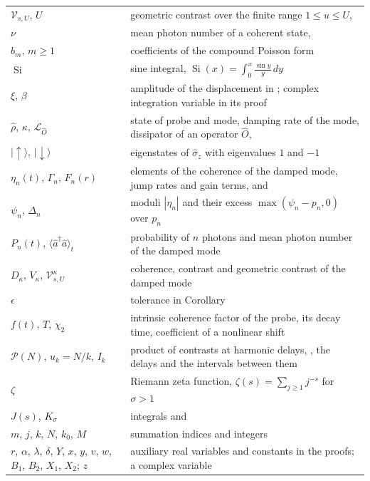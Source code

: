 \documentclass[11pt,reqno]{amsart}
\makeatletter
\providecommand{\ket}[1]{|#1\rangle}
\let\CG@origref\ref
\let\CG@origeqref\eqref
\newcommand{\CG@gettip}[1]{\@ifundefined{CGTip@#1}{Reference: #1}{\csname CGTip@#1\endcsname}}
\DeclareRobustCommand{\CGref}[1]{\pdftooltip{\CG@origref{#1}}{\CG@gettip{#1}}}
\DeclareRobustCommand{\CGeqref}[1]{\pdftooltip{\CG@origeqref{#1}}{\CG@gettip{#1}}}
\numberwithin{equation}{section}
\theoremstyle{plain}
\theoremstyle{definition}
\theoremstyle{remark}
\makeatother
\begin{document}
\begin{table}[!htb]
\begin{tabular}{p{}p{}}
$\mathcal V_{s,U}$, $U$ & geometric contrast over the finite range $1\le u\le U$, \CGeqref{eq:VsU}\\
$\nu$ & mean photon number of a coherent state, \CGeqref{eq:coh}\\
$b_m$, $m\ge1$ & coefficients of the compound Poisson form \CGeqref{eq:cp}\\
$\operatorname{Si}$ & sine integral, $\operatorname{Si}(x)=\int_0^x\frac{\sin y}y\,dy$\\
$\xi$, $\beta$ & amplitude of the displacement in \CGeqref{eq:dt}; complex integration variable in its proof\\
$\hat\rho$, $\kappa$, $\mathcal L_{\hat O}$ & state of probe and mode, damping rate of the mode, dissipator of an operator $\hat O$, \CGeqref{eq:master}\\
$\ket\uparrow$, $\ket\downarrow$ & eigenstates of $\hat\sigma_z$ with eigenvalues $1$ and $-1$\\
$\eta_n(t)$, $\Gamma_n$, $F_n(r)$ & elements of the coherence of the damped mode, jump rates and gain terms, \CGeqref{eq:rate} and \CGeqref{eq:duhamel}\\
$\psi_n$, $\Delta_n$ & moduli $|\eta_n|$ and their excess $\max(\psi_n-p_n,0)$ over $p_n$\\
$P_n(t)$, $\langle\hat a^\dagger\hat a\rangle_t$ & probability of $n$ photons and mean photon number of the damped mode\\
$D_\kappa$, $V_\kappa$, $\mathcal V^\kappa_{s,U}$ & coherence, contrast and geometric contrast of the damped mode\\
$\epsilon$ & tolerance in Corollary~\CGref{cor:damp}\\
$f(t)$, $T$, $\chi_2$ & intrinsic coherence factor of the probe, its decay time, coefficient of a nonlinear shift\\
$\mathcal P(N)$, $u_k=N/k$, $I_k$ & product of contrasts at harmonic delays, \CGeqref{eq:PN}, the delays and the intervals between them\\
$\zeta$ & Riemann zeta function, $\zeta(s)=\sum_{j\ge1}j^{-s}$ for $\sigma>1$\\
$J(s)$, $K_\sigma$ & integrals \CGeqref{eq:J} and \CGeqref{eq:Ksigma}\\
$m$, $j$, $k$, $N$, $k_0$, $M$ & summation indices and integers\\
$r$, $\alpha$, $\lambda$, $\delta$, $Y$, $x$, $y$, $v$, $w$, $B_1$, $B_2$, $X_1$, $X_2$; $z$ & auxiliary real variables and constants in the proofs; a complex variable\\
\bottomrule
\end{tabular}
\end{table}
\end{document}
